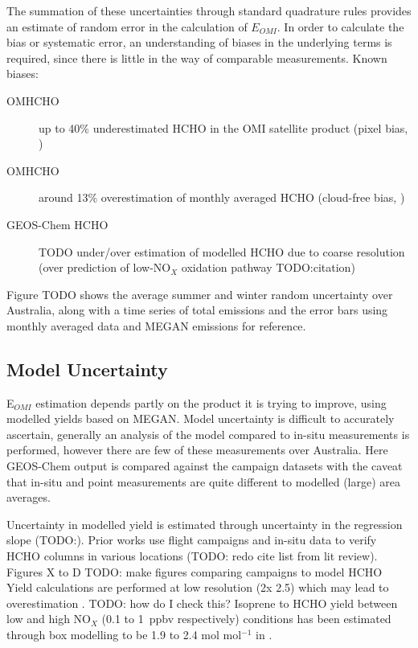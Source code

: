     The summation of these uncertainties through standard quadrature rules provides an estimate of random error in the calculation of $E_{OMI}$.
    In order to calculate the bias or systematic error, an understanding of biases in the underlying terms is required, since there is little in the way of comparable measurements.
    Known biases: 
    \begin{description}
      \item[OMHCHO] up to 40\% underestimated HCHO in the OMI satellite product (pixel bias, \parencite{Zhu2016,DeSmedt2015,Barkley2013})
      \item[OMHCHO] around 13\% overestimation of monthly averaged HCHO (cloud-free bias, \parencite{Surl2018})
      \item[GEOS-Chem HCHO] TODO under/over estimation of modelled HCHO due to coarse resolution (over prediction of low-NO$_X$ oxidation pathway TODO:citation)
    \end{description}
    
    Figure TODO shows the average summer and winter random uncertainty over Australia, along with a time series of total emissions and the error bars using monthly averaged data and MEGAN emissions for reference.
  
  \subsection{Model Uncertainty}
    \label{BioIsop:uncertainty:Model}
    
    E$_{OMI}$ estimation depends partly on the product it is trying to improve, using modelled yields based on MEGAN.
    Model uncertainty is difficult to accurately ascertain, generally an analysis of the model compared to in-situ measurements is performed, however there are few of these measurements over Australia.
    Here GEOS-Chem output is compared against the campaign datasets with the caveat that in-situ and point measurements are quite different to modelled (large) area averages.
    
    Uncertainty in modelled yield is estimated through uncertainty in the regression slope (TODO:).
    Prior works use flight campaigns and in-situ data to verify HCHO columns in various locations (TODO: redo cite list from lit review).
    Figures X to D TODO: make figures comparing campaigns to model HCHO
    Yield calculations are performed at low resolution (2\degr x 2.5\degr) which may lead to overestimation \parencite{Yu2016}.
    TODO: how do I check this?
    Isoprene to HCHO yield between low and high NO$_X$ (0.1 to 1~ppbv respectively) conditions has been estimated through box modelling to be 1.9 to 2.4 mol mol$^{-1}$ in \textcite{Bauwens2016}.
    
